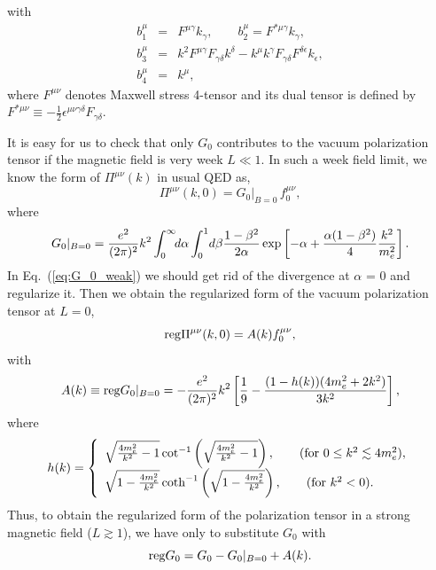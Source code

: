 with
\begin{eqnarray}
    \label{eq:b_i}
    b_1^{\mu} &=& F^{\mu\gamma}k_{\gamma},
    \qquad b_2^{\mu} = F^{*\mu\gamma}k_{\gamma}, \\
    b_3^{\mu} &=& k^2 F^{\mu\gamma} F_{\gamma\delta}k^{\delta}
    - k^{\mu}k^{\gamma}F_{\gamma\delta}F^{\delta\epsilon}k_{\epsilon},\\
    b_4^{\mu} &=& k^{\mu},
\end{eqnarray}
where $F^{\mu\nu}$ denotes Maxwell stress 4-tensor and its dual tensor
is defined by $F^{*\mu\nu} \equiv -
\frac12\epsilon^{\mu\nu\gamma\delta}F_{\gamma\delta}$.

It is easy for us to check that only $G_0$ contributes to the vacuum
polarization tensor if the magnetic field is very week $L \ll 1$. In
such a week field limit, we know the form of
$\Pi^{\mu\nu}(k)$ in usual QED as,
\begin{equation}
    \label{eq:B_weak}
    \Pi^{\mu\nu}(k,0) = G_0|_{B=0}\, f_0^{\mu\nu},
\end{equation}
where
\begin{equation}
    G_0|_{B=0} = \frac{e^2}{(2\pi)^2}k^2\int^{\infty}_0 \!\!d\alpha \int^1_0
    \!d\beta \frac{1-\beta^2}{2\alpha}
    \exp\left[-\alpha+\frac{\alpha(1-\beta^2)}{4}\frac{k^2}{m_e^2}\right].
    \label{eq:G_0_weak}
\end{equation}
In Eq.~(\ref{eq:G_0_weak}) we should get rid of the divergence at
$\alpha$ = 0 and regularize it. Then we obtain the regularized form of
the vacuum polarization tensor at $L = 0$,
\begin{equation}
    \label{eq:reg_pi}
    {\rm reg}\Pi^{\mu\nu}(k,0) = A(k)f_0^{\mu\nu},
\end{equation}
with
\begin{equation}
    \label{eq:A_k}
    A(k) \equiv {\rm reg}G_0|_{B=0} =  - \frac{e^2}{(2\pi)^2}k^2
     \left[ \frac19 - \frac{(1-h(k))(4m_e^2+2k^2)}{3k^2}\right],
\end{equation}
where
\begin{equation}
    \label{eq:h_k}
    h(k) = \left\{
      \begin{array}{ll}
          \sqrt{\frac{4m_e^2}{k^2}-1}\cot^{-1}
          \left(\sqrt{\frac{4m_e^2}{k^2}-1}\right),
          \qquad ({\rm for} \  0 \le k^2 \lesssim 4m_e^2),\\
          \sqrt{1-\frac{4m_e^2}{k^2}}\coth^{-1}
          \left(\sqrt{1-\frac{4m_e^2}{k^2}}\right),
          \qquad ({\rm for} \  k^2 < 0).
       \end{array}
    \right.
\end{equation}
Thus, to obtain the regularized form of the polarization tensor in
a strong magnetic field ($L \gtrsim 1$), we have only to substitute $G_0$
 with
\begin{equation}
    \label{eq:regg0}
    {\rm reg}G_0 = G_0 - G_0|_{B=0} + A(k).
\end{equation}

